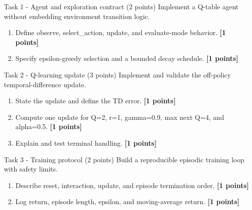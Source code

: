 \documentclass[aspectratio=169,11pt]{beamer}
\begin{document}
\begin{frame}{Task 1 - Agent and exploration contract (2 points)}
\small
Implement a Q-table agent without embedding environment transition logic.

\vspace{0.2cm}
\begin{enumerate}
\item[\textbf{a.}] Define observe, select\_action, update, and evaluate-mode behavior. \hfill{\color{courseblue}\textbf{[1 points]}}
\item[\textbf{b.}] Specify epsilon-greedy selection and a bounded decay schedule. \hfill{\color{courseblue}\textbf{[1 points]}}
\end{enumerate}
\end{frame}

\begin{frame}{Task 2 - Q-learning update (3 points)}
\small
Implement and validate the off-policy temporal-difference update.

\vspace{0.2cm}
\begin{enumerate}
\item[\textbf{a.}] State the update and define the TD error. \hfill{\color{courseblue}\textbf{[1 points]}}
\item[\textbf{b.}] Compute one update for Q=2, r=1, gamma=0.9, max next Q=4, and alpha=0.5. \hfill{\color{courseblue}\textbf{[1 points]}}
\item[\textbf{c.}] Explain and test terminal handling. \hfill{\color{courseblue}\textbf{[1 points]}}
\end{enumerate}
\end{frame}

\begin{frame}{Task 3 - Training protocol (2 points)}
\small
Build a reproducible episodic training loop with safety limits.

\vspace{0.2cm}
\begin{enumerate}
\item[\textbf{a.}] Describe reset, interaction, update, and episode termination order. \hfill{\color{courseblue}\textbf{[1 points]}}
\item[\textbf{b.}] Log return, episode length, epsilon, and moving-average return. \hfill{\color{courseblue}\textbf{[1 points]}}
\end{enumerate}
\end{frame}
\end{document}

